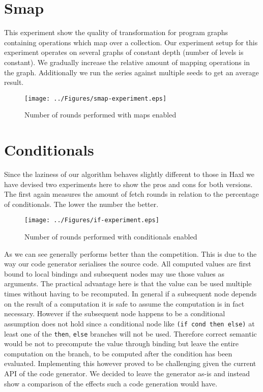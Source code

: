 \section{Smap}

This experiment show the quality of transformation for program graphs containing operations which map over a collection.
Our experiment setup for this experiment operates on several graphs of constant depth (number of levels is constant).
We gradually increase the relative amount of mapping operations in the graph.
Additionally we run the series against multiple seeds to get an average result.

\begin{figure}
    \texttt{[image: ../Figures/smap-experiment.eps]}
    \caption{Number of rounds performed with maps enabled}
\end{figure}

\section{Conditionals}

Since the laziness of our algorithm behaves slightly different to those in Haxl we have devised two experiments here to show the pros and cons for both versions.
The first again measures the amount of fetch rounds in relation to the percentage of conditionals.
The lower the number the better.

\begin{figure}
    \texttt{[image: ../Figures/if-experiment.eps]}
    \caption{Number of rounds performed with conditionals enabled}
\end{figure}

As we can see \yauhau{} generally performs better than the competition.
This is due to the way our code generator serialises the source code.
All computed values are first bound to local bindings and subsequent nodes may use those values as arguments.
The practical advantage here is that the value can be used multiple times without having to be recomputed.
In general if a subsequent node depends on the result of a computation it is safe to assume the computation is in fact necessary.
However if the subsequent node happens to be a conditional assumption does not hold since a conditional node like \texttt{(if cond then else)} at least one of the \texttt{then}, \texttt{else} branches will not be used.
Therefore correct semantic would be not to precompute the value through binding but leave the entire computation on the branch, to be computed after the condition has been evaluated.
Implementing this however proved to be challenging given the current API of the code generator.
We decided to leave the generator as-is and instead show a comparison of the effects such a code generation would have.

